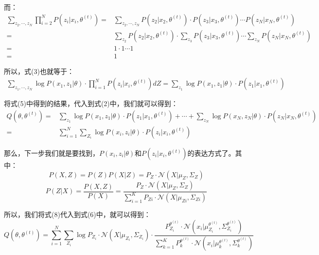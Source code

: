 \documentclass[a4paper]{article}
\begin{document}
而：
\begin{equation}
    \begin{split}
        \sum_{z_2,\cdots,z_N} \prod_{i=2}^N P(z_i|x_i,\theta^{(t)}) 
        = & \sum_{z_2,\cdots,z_N} P(z_2|x_2,\theta^{(t)})\cdot P(z_3|x_3,\theta^{(t)})\cdots P(z_N|x_N,\theta^{(t)}) \\
        = & \sum_{z_2} P(z_2|x_2,\theta^{(t)})\cdot \sum_{z_3} P(z_3|x_3,\theta^{(t)})\cdots \sum_{z_N} P(z_N|x_N,\theta^{(t)}) \\
        = & 1 \cdot 1 \cdots 1 \\
        = & 1 
    \end{split}
\end{equation}

所以，式(3)也就等于：
\begin{equation}
    \begin{split}
        \sum_{z_1,\cdots,z_N} \log P(x_1,z_1|\theta) \cdot \prod_{i=1}^N P(z_i|x_i,\theta^{(t)}) dZ = \sum_{z_1} \log P(x_1,z_1|\theta) \cdot  P(z_1|x_1,\theta^{(t)})
    \end{split}
\end{equation}

将式(5)中得到的结果，代入到式(2)中，我们就可以得到：
\begin{equation}
    \begin{split}
         Q(\theta,\theta^{(t)}) 
        = & \sum_{z_1} \log P(x_1,z_1|\theta) \cdot  P(z_1|x_1,\theta^{(t)}) + \cdots +  \sum_{z_N} \log P(x_N,z_N|\theta) \cdot  P(z_N|x_N,\theta^{(t)}) \\
        = & \sum_{i=1}^N \sum_{Z_i} \log P(x_i,z_i|\theta) \cdot  P(z_i|x_i,\theta^{(t)})
    \end{split}
\end{equation}

那么，下一步我们就是要找到，$P(x_i,z_i|\theta)$和$P(z_i|x_i,\theta^{(t)})$的表达方式了。其中：
\begin{equation}
    P(X,Z) = P(Z)P(X|Z) = P_Z\cdot \mathcal{N}(X|\mu_Z,\Sigma_Z)
\end{equation}
\begin{equation}
    P(Z|X) = \frac{P(X,Z)}{P(X)} = \frac{P_Z\cdot \mathcal{N}(X|\mu_Z,\Sigma_Z)}{\sum_{i=1}^K P_{Zi}\cdot \mathcal{N}(X|\mu_{Zi},\Sigma_{Zi})}
\end{equation}

所以，我们将式(8)代入到式(6)中，就可以得到：
\begin{equation}
     Q(\theta,\theta^{(t)})  =    \sum_{i=1}^N \sum_{Z_i} \log P_{Z_i}\cdot \mathcal{N}(X|\mu_{Z_i},\Sigma_{Z_i}) \cdot \frac{P_{Z_i}^{\theta^{(t)}}\cdot \mathcal{N}(x_i|\mu_{Z_i}^{\theta^{(t)}},\Sigma_{Z_i}^{\theta^{(t)}})}{\sum_{k=1}^K P_k^{\theta^{(t)}}\cdot \mathcal{N}(x_i|\mu_k^{\theta^{(t)}},\Sigma_k^{\theta^{(t)}})}
\end{equation}
\end{document}

